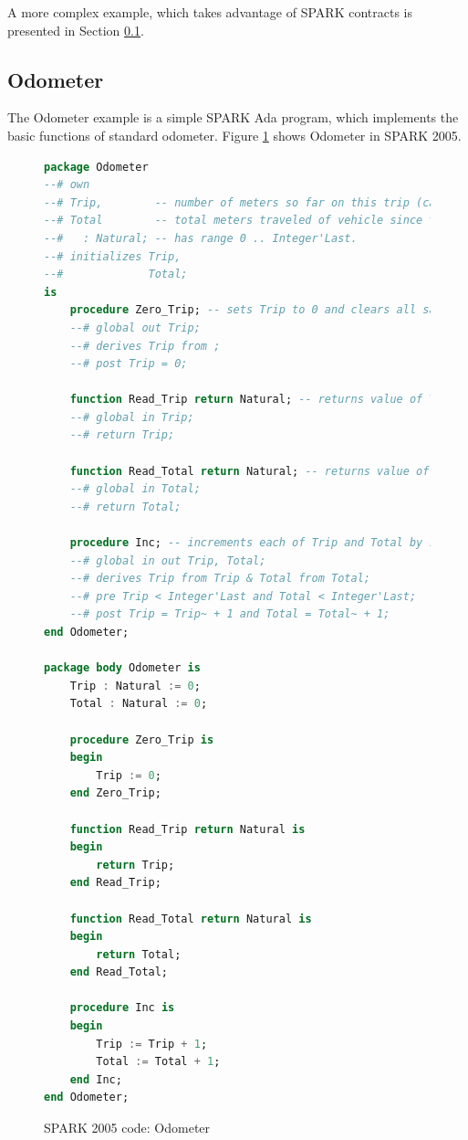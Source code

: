 A more complex example, which takes advantage of SPARK contracts is presented in Section \ref{pcapumpimpl:beagleboard:odometer}.

\subsection{Odometer}
\label{pcapumpimpl:beagleboard:odometer}

The Odometer example is a simple SPARK Ada program, which implements the basic functions of standard odometer. Figure \ref{listing:Odometer2005} shows Odometer in SPARK 2005.

\begin{figure} %
\singlespacing
\begin{lstlisting}[language=ada, frame=single, gobble=0]
package Odometer
--# own
--# Trip,        -- number of meters so far on this trip (can be reset to 0).
--# Total        -- total meters traveled of vehicle since the last factory-reset.
--#   : Natural; -- has range 0 .. Integer'Last.
--# initializes Trip,
--#             Total;
is
    procedure Zero_Trip; -- sets Trip to 0 and clears all saved Trip marks.
    --# global out Trip;
    --# derives Trip from ;
    --# post Trip = 0;
    
    function Read_Trip return Natural; -- returns value of Trip.
    --# global in Trip;
    --# return Trip;
    
    function Read_Total return Natural; -- returns value of Total
    --# global in Total;
    --# return Total;
    
    procedure Inc; -- increments each of Trip and Total by 1.
    --# global in out Trip, Total;
    --# derives Trip from Trip & Total from Total;
    --# pre Trip < Integer'Last and Total < Integer'Last;
    --# post Trip = Trip~ + 1 and Total = Total~ + 1;	    
end Odometer;

package body Odometer is
    Trip : Natural := 0;
    Total : Natural := 0;
    
    procedure Zero_Trip is
    begin
        Trip := 0;
    end Zero_Trip;
    
    function Read_Trip return Natural is
    begin
        return Trip;
    end Read_Trip;
    
    function Read_Total return Natural is
    begin
        return Total;
    end Read_Total;
    
    procedure Inc is
    begin
        Trip := Trip + 1;
        Total := Total + 1;
    end Inc;
end Odometer;
\end{lstlisting} 
\doublespacing
\caption{SPARK 2005 code: Odometer}
\label{listing:Odometer2005}
\end{figure}

